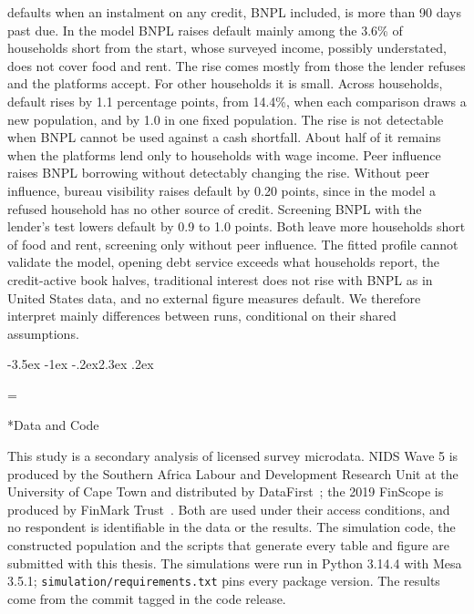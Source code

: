 \documentclass[12pt, a4paper]{article}
\makeatletter
\newcommand{\headingstyle}{\raggedright\hyphenpenalty=\@M}
\renewcommand\section{\@startsection{section}{1}{\z@}%
    {-3.5ex \@plus -1ex \@minus -.2ex}{2.3ex \@plus.2ex}{\normalfont\Large\bfseries\headingstyle}}
\makeatother
\begin{document}
defaults when an instalment on any credit, \ac{BNPL} included, is more than 90 days past
due. In the model \ac{BNPL} raises default mainly among the 3.6\% of households short from the
start, whose surveyed income, possibly understated, does not cover food and rent. The rise comes
mostly from those the lender refuses and the platforms accept. For other households it is small.
Across households, default rises by 1.1 percentage points, from 14.4\%, when each comparison
draws a new population, and by 1.0 in one fixed population. The rise is not
detectable when \ac{BNPL} cannot be used against a cash shortfall. About half of it remains when
the platforms lend only to households with wage income. Peer influence raises \ac{BNPL} borrowing without detectably
changing the rise. Without peer influence, bureau
visibility raises default by 0.20 points, since in the model a refused household has no other
source of credit. Screening \ac{BNPL} with the lender's test lowers default by 0.9 to 1.0 points.
Both leave more households short of food and rent, screening only without peer influence. The
fitted profile cannot validate the model, opening debt service exceeds what households report,
the credit-active book halves, traditional interest does not rise with \ac{BNPL}
as in United States data, and no external figure measures default. We therefore interpret mainly
differences between runs, conditional on their shared assumptions.

\clearpage
\section*{Data and Code}


This study is a secondary analysis of licensed survey microdata. \ac{NIDS} Wave 5
is produced by the Southern Africa Labour and Development Research Unit at the
University of Cape Town and distributed by DataFirst~\citep{nids_w5_2018}; the 2019
\ac{FinScope} is produced by FinMark Trust~\citep{finscope2019}. Both are used under
their access conditions, and no respondent is identifiable in the data or the
results. The simulation code, the constructed population and the scripts that
generate every table and figure are submitted with this thesis. The simulations were run in
Python 3.14.4 with Mesa 3.5.1; \texttt{simulation/requirements.txt} pins every package
version. The results come from the commit tagged in the code release.
\end{document}
